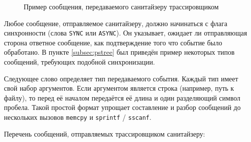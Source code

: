 \begin{figure}[H]

    \caption{Пример сообщения, передаваемого санитайзеру трассировщиком}
\end{figure}

Любое сообщение, отправляемое санитайзеру, должно начинаться с флага синхронности (слова \texttt{SYNC} или \texttt{ASYNC}). Он указывает, ожидает ли отправляющая сторона ответное сообщение, как подтверждение того что событие было обработано. В пункте \ref{subsec:pstree} был приведён пример некоторых типов сообщений, требующих подобной синхронизации.

Следующее слово определяет тип передаваемого события. Каждый тип имеет свой набор аргументов. Если аргументом является строка (например, путь к файлу), то перед её началом передаётся её длина и один разделяющий символ пробела. Такой простой формат упрощает составление и разбор сообщений до нескольких вызовов \texttt{memcpy} и \texttt{sprintf} / \texttt{sscanf}.

Перечень сообщений, отправляемых трассировщиком санитайзеру:


